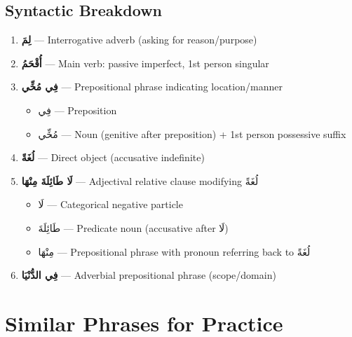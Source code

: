 \documentclass[letterpaper,12pt]{article}
\begin{document}
\subsection{Syntactic Breakdown}
\begin{tcolorbox}[colback=white,colframe=headercolor,breakable]
\begin{enumerate}
\item \textbf{\textarabic{لِمَ}} — Interrogative adverb (asking for reason/purpose)
\item \textbf{\textarabic{أُقْحَمُ}} — Main verb: passive imperfect, 1st person singular
\item \textbf{\textarabic{فِي مُخِّي}} — Prepositional phrase indicating location/manner
  \begin{itemize}
  \item \textarabic{فِي} — Preposition
  \item \textarabic{مُخِّي} — Noun (genitive after preposition) + 1st person possessive suffix
  \end{itemize}
\item \textbf{\textarabic{لُغَةً}} — Direct object (accusative indefinite)
\item \textbf{\textarabic{لَا طَائِلَةَ مِنْهَا}} — Adjectival relative clause modifying \textarabic{لُغَةً}
  \begin{itemize}
  \item \textarabic{لَا} — Categorical negative particle
  \item \textarabic{طَائِلَةَ} — Predicate noun (accusative after \textarabic{لَا})
  \item \textarabic{مِنْهَا} — Prepositional phrase with pronoun referring back to \textarabic{لُغَةً}
  \end{itemize}
\item \textbf{\textarabic{فِي الدُّنْيَا}} — Adverbial prepositional phrase (scope/domain)
\end{enumerate}
\end{tcolorbox}

\section{Similar Phrases for Practice}
\end{document}
